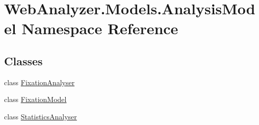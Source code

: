 \hypertarget{namespace_web_analyzer_1_1_models_1_1_analysis_model}{}\section{Web\+Analyzer.\+Models.\+Analysis\+Model Namespace Reference}
\label{namespace_web_analyzer_1_1_models_1_1_analysis_model}
\subsection*{Classes}
\begin{DoxyCompactItemize}
\item 
class \hyperlink{class_web_analyzer_1_1_models_1_1_analysis_model_1_1_fixation_analyser}{Fixation\+Analyser}
\item 
class \hyperlink{class_web_analyzer_1_1_models_1_1_analysis_model_1_1_fixation_model}{Fixation\+Model}
\item 
class \hyperlink{class_web_analyzer_1_1_models_1_1_analysis_model_1_1_statistics_analyser}{Statistics\+Analyser}
\end{DoxyCompactItemize}

